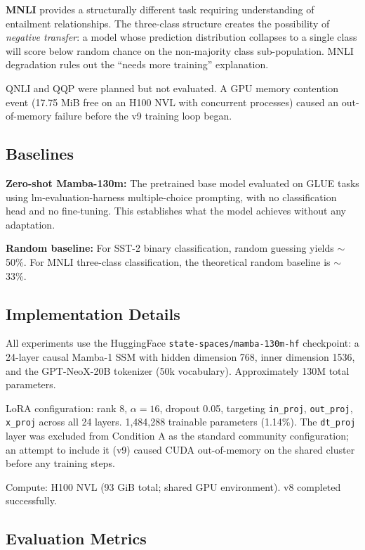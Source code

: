\textbf{MNLI} provides a structurally different task requiring understanding of entailment relationships. The three-class structure creates the possibility of \emph{negative transfer}: a model whose prediction distribution collapses to a single class will score below random chance on the non-majority class sub-population. MNLI degradation rules out the ``needs more training'' explanation.

QNLI and QQP were planned but not evaluated. A GPU memory contention event (17.75 MiB free on an H100 NVL with concurrent processes) caused an out-of-memory failure before the v9 training loop began.

\subsection{Baselines}

\textbf{Zero-shot Mamba-130m:} The pretrained base model evaluated on GLUE tasks using lm-evaluation-harness multiple-choice prompting, with no classification head and no fine-tuning. This establishes what the model achieves without any adaptation.

\textbf{Random baseline:} For SST-2 binary classification, random guessing yields $\sim$50\%. For MNLI three-class classification, the theoretical random baseline is $\sim$33\%.

\subsection{Implementation Details}

All experiments use the HuggingFace \texttt{state-spaces/mamba-130m-hf} checkpoint: a 24-layer causal Mamba-1 SSM with hidden dimension 768, inner dimension 1536, and the GPT-NeoX-20B tokenizer (50k vocabulary). Approximately 130M total parameters.

LoRA configuration: rank 8, $\alpha = 16$, dropout 0.05, targeting \texttt{in\_proj}, \texttt{out\_proj}, \texttt{x\_proj} across all 24 layers. 1,484,288 trainable parameters (1.14\%). The \texttt{dt\_proj} layer was excluded from Condition A as the standard community configuration; an attempt to include it (v9) caused CUDA out-of-memory on the shared cluster before any training steps.

Compute: H100 NVL (93 GiB total; shared GPU environment). v8 completed successfully.

\subsection{Evaluation Metrics}

